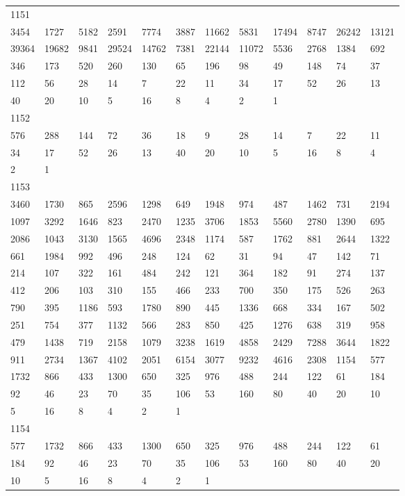 \begin{longtable}{llllllllllll}
1151&&&&&&&&&&&\\
3454& 1727& 5182& 2591& 7774& 3887& 11662& 5831& 17494& 8747& 26242& 13121\\
39364& 19682& 9841& 29524& 14762& 7381& 22144& 11072& 5536& 2768& 1384& 692\\
346& 173& 520& 260& 130& 65& 196& 98& 49& 148& 74& 37\\
112& 56& 28& 14& 7& 22& 11& 34& 17& 52& 26& 13\\
40& 20& 10& 5& 16& 8& 4& 2& 1& \\

1152&&&&&&&&&&&\\
576& 288& 144& 72& 36& 18& 9& 28& 14& 7& 22& 11\\
34& 17& 52& 26& 13& 40& 20& 10& 5& 16& 8& 4\\
2& 1& \\

1153&&&&&&&&&&&\\
3460& 1730& 865& 2596& 1298& 649& 1948& 974& 487& 1462& 731& 2194\\
1097& 3292& 1646& 823& 2470& 1235& 3706& 1853& 5560& 2780& 1390& 695\\
2086& 1043& 3130& 1565& 4696& 2348& 1174& 587& 1762& 881& 2644& 1322\\
661& 1984& 992& 496& 248& 124& 62& 31& 94& 47& 142& 71\\
214& 107& 322& 161& 484& 242& 121& 364& 182& 91& 274& 137\\
412& 206& 103& 310& 155& 466& 233& 700& 350& 175& 526& 263\\
790& 395& 1186& 593& 1780& 890& 445& 1336& 668& 334& 167& 502\\
251& 754& 377& 1132& 566& 283& 850& 425& 1276& 638& 319& 958\\
479& 1438& 719& 2158& 1079& 3238& 1619& 4858& 2429& 7288& 3644& 1822\\
911& 2734& 1367& 4102& 2051& 6154& 3077& 9232& 4616& 2308& 1154& 577\\
1732& 866& 433& 1300& 650& 325& 976& 488& 244& 122& 61& 184\\
92& 46& 23& 70& 35& 106& 53& 160& 80& 40& 20& 10\\
5& 16& 8& 4& 2& 1& \\

1154&&&&&&&&&&&\\
577& 1732& 866& 433& 1300& 650& 325& 976& 488& 244& 122& 61\\
184& 92& 46& 23& 70& 35& 106& 53& 160& 80& 40& 20\\
10& 5& 16& 8& 4& 2& 1& \\


\end{longtable}
